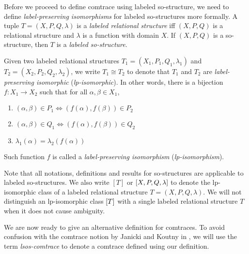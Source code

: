 \documentclass{llncs}
\begin{document}
Before we proceed to define comtrace using labeled so-structure, we need to define  \textit{label-preserving isomorphisms} for labeled so-structures more formally. A tuple $T = (X,P,Q,\lambda)$ is a \textit{labeled relational structure} iff $(X,P,Q)$ is a relational structure and $\lambda$ is a function with domain $X$. If $(X,P,Q)$ is a so-structure, then $T$ is a \textit{labeled so-structure}.

\begin{definition} Given two labeled relational structures $T_{1}=(X_{1},P_{1},Q_{1},\lambda_{1})$ and $T_{2}=(X_{2},P_{2},Q_{2},\lambda_{2})$, we write $T_{1}\cong T_{2}$ to denote that $T_1$ and $T_2$ are  \emph{label-preserving isomorphic} (\emph{lp-isomorphic}). In other words, there is a bijection $f: X_{1} \rightarrow X_{2}$ such that for all $\alpha,\beta \in  X_{1}$, 
\begin{enumerate}
\item $(\alpha,\beta) \in P_{1} \iff (f(\alpha),f(\beta))\in P_{2}$
\item $(\alpha,\beta) \in Q_{1} \iff (f(\alpha),f(\beta))\in Q_{2}$
\item $\lambda_{1}(\alpha) = \lambda_{2}(f(\alpha))$
\end{enumerate}
Such function $f$ is called a \emph{label-preserving isomorphism} (\emph{lp-isomorphism}). \EOD
\end{definition}

Note that all notations, definitions and results for so-structures are applicable to labeled so-structures. We also write $[T]$ or $\left[ X,P,Q,\lambda \right]$ to denote the lp-isomorphic class of a labeled relational structure $T=(X,P,Q,\lambda)$. We  will not distinguish  an lp-isomorphic class $\left[ T \right]$ with a single labeled relational structure $T$ when it does not cause ambiguity.



We are now ready to give an alternative definition for comtraces. To avoid confusion with the comtrace notion by Janicki and Koutny in \cite{JK95}, we will use the term \emph{lsos-comtrace} to denote a comtrace defined using our definition.
\end{document}
